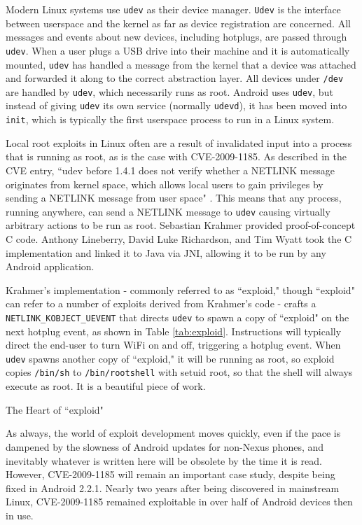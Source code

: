 Modern Linux systems use \texttt{udev} as their device manager.  \texttt{Udev} is the interface between userspace and the kernel as
far as device registration are concerned.  All messages and events about new devices, including hotplugs, are passed through
\texttt{udev}.  When a user plugs a USB drive into their machine and it is automatically mounted, \texttt{udev} has handled a
message from the kernel that a device was attached and forwarded it along to the correct abstraction layer.  All devices under
\texttt{/dev} are handled by \texttt{udev}, which necessarily runs as root.  Android uses \texttt{udev}, but instead of giving
\texttt{udev} its own service (normally \texttt{udevd}), it has been moved into \texttt{init}, which is typically the first
userspace process to run in a Linux system.

Local root exploits in Linux often are a result of invalidated input into a process that is running as root, as is the case with
CVE-2009-1185.  As described in the CVE entry, ``udev before 1.4.1 does not verify whether a NETLINK message originates from kernel
space, which allows local users to gain privileges by sending a NETLINK message from user space" \cite{udevcve}.  This means that
any process, running anywhere, can send a NETLINK message to \texttt{udev} causing virtually arbitrary actions to be run as root.
Sebastian Krahmer provided proof-of-concept C code.  Anthony Lineberry, David Luke Richardson, and Tim Wyatt
\citeyear{arentpermissions} took the C implementation and linked it to Java via JNI, allowing it to be run by any Android
application.

Krahmer's implementation - commonly referred to as ``exploid," though ``exploid" can refer to a number of exploits derived from
Krahmer's code - crafts a \texttt{NETLINK\_KOBJECT\_UEVENT} that directs \texttt{udev} to spawn a copy of ``exploid" on the next
hotplug event, as shown in Table \ref{tab:exploid}.  Instructions will typically direct the end-user to turn WiFi on and off,
triggering a hotplug event.  When \texttt{udev} spawns another copy of ``exploid," it will be running as root, so exploid copies
\texttt{/bin/sh} to \texttt{/bin/rootshell} with setuid root, so that the shell will always execute as root.  It is a beautiful
piece of work.

\begin{table}[htb]

\caption{The Heart of ``exploid"}
\label{tab:exploid}
\end{table}

As always, the world of exploit development moves quickly, even if the pace is dampened by the slowness of Android updates for
non-Nexus phones, and inevitably whatever is written here will be obsolete by the time it is read.  However, CVE-2009-1185 will
remain an important case study, despite being fixed in Android 2.2.1.  Nearly two years after being discovered in mainstream Linux,
CVE-2009-1185 remained exploitable in over half of Android devices then in use.

